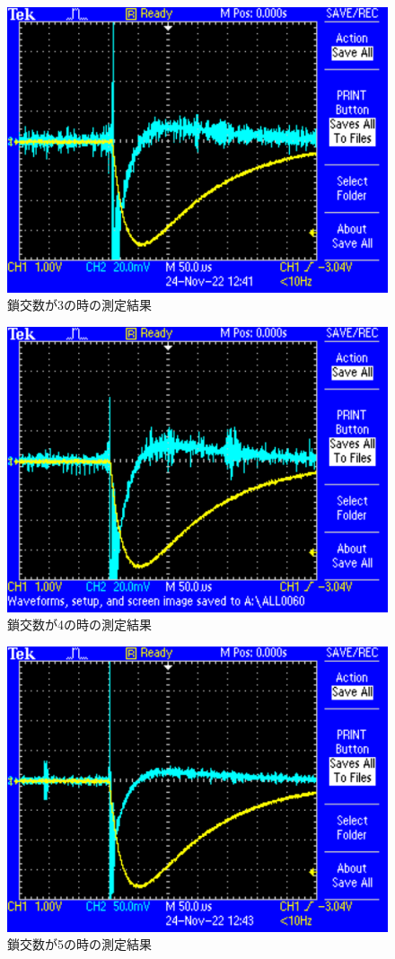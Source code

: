 \begin{figure}[H]
    \centering
    \includegraphics[scale=0.5]{rogowskii-3.pdf}
    \caption{鎖交数が3の時の測定結果}
\end{figure}

\begin{figure}[H]
    \centering
    \includegraphics[scale=0.5]{rogowskii-4.pdf}
    \caption{鎖交数が4の時の測定結果}
\end{figure}

\begin{figure}[H]
    \centering
    \includegraphics[scale=0.5]{rogowskii-5.pdf}
    \caption{鎖交数が5の時の測定結果}
\end{figure}
